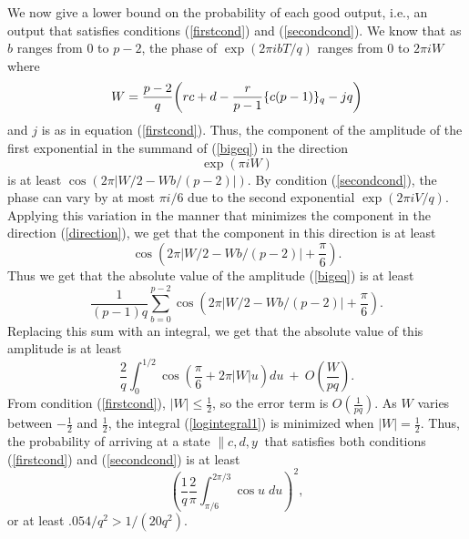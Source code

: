 We now give a lower bound
on the probability of each good output, i.e., an output that satisfies 
conditions (\ref{firstcond}) and (\ref{secondcond}).  
We know that as $b$ ranges from 0 to $p-2$, the phase of
$\exp(2\pi i bT/q)$ ranges from
$0$ to $2\pi i W$ where
\begin{equation}
W = \frac{p-2}{q} 
{\left(rc+d-\frac{r}{p-1}{\{c(p-1)\}_{q}} -jq \right)}
\end{equation}
and $j$ is as in equation (\ref{firstcond}).
Thus, the component of the
amplitude of the first exponential in the summand of (\ref{bigeq}) 
in the direction 
\begin{equation}
\exp\left( \pi i W
\right)
\label{direction}
\end{equation}
is at least $\cos(2 \pi \left| W/2 - Wb/(p-2)\right|)$.  By condition 
(\ref{secondcond}), the phase can vary by at most ${\pi i/6}$ due to 
the second exponential $\exp(2\pi i V/q)$.  
Applying this variation in the manner that minimizes the component 
in the direction (\ref{direction}), we get that the component in this 
direction is at least 
\begin{equation}
\cos(2 \pi \left| W/2 - Wb/(p-2)\right| + {\textstyle\frac{\pi}{6}}).  
\end{equation}
Thus we get that the absolute value of the amplitude (\ref{bigeq}) is at 
least
\begin{equation}
\frac{1}{(p-1)q} \sum_{b=0}^{p-2} \cos\left(2 \pi \left| W/2-Wb/(p-2)\right| 
+ {\textstyle\frac{\pi}{6}}\right).
\end{equation}
Replacing this sum with an integral, we get that 
the absolute value of this amplitude is at least
\begin{equation}
\frac{2}{q} \int_{0}^{1/2} \cos (\textstyle \frac{\pi}{6} + 2\pi |W| u) du
\ + \ O\left(\frac{W}{pq}\right).
\label{logintegral1}
\end{equation}
 From condition (\ref{firstcond}), $|W| \leq \frac{1}{2}$, so the error term
is $O(\frac{1}{pq})$.
As $W$ varies between $-\frac{1}{2}$ and $\frac{1}{2}$, 
the integral (\ref{logintegral1})
is minimized when $|W|=\frac{1}{2}$.
Thus, the probability of 
arriving at a state $\|c,d,y\>$ that satisfies both conditions
(\ref{firstcond}) and (\ref{secondcond}) is at least
\begin{equation}
\left(
\frac{1}{q} \frac{2}{\pi} \int_{\pi/6}^{2\pi/3} \cos u \; du 
\right)^2,
\end{equation}
or at least $.054 / q^2 > 1/(20q^2)$.  

